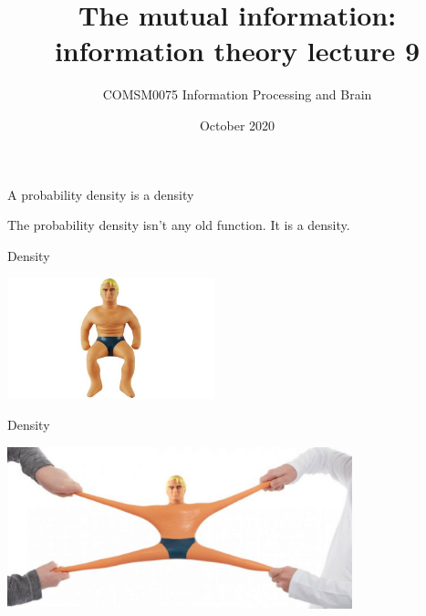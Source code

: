 \documentclass{beamer}
\title[Information Theory lecture 8]{The mutual information: information theory lecture 9}
\author{COMSM0075 Information Processing and Brain}
\institute{\texttt{comsm0075.github.io}}
\date{October 2020}
\newcommand{\cbla}{\color{black}}
\newcommand{\cblu}{\color{blue}}
\begin{document}
\maketitle





\begin{frame}{A probability density is a density}

  The probability density isn't any old function. It is a \cblu{}density\cbla.

\end{frame}

\begin{frame}{Density}
  \begin{center}
    \includegraphics[width=6cm]{unstretched_armstrong.jpg}
  \end{center}
\end{frame}


\begin{frame}{Density}
  \begin{center}
    \includegraphics[width=10cm]{stretch-armstrong.jpg}
  \end{center}
\end{frame}
\end{document}
